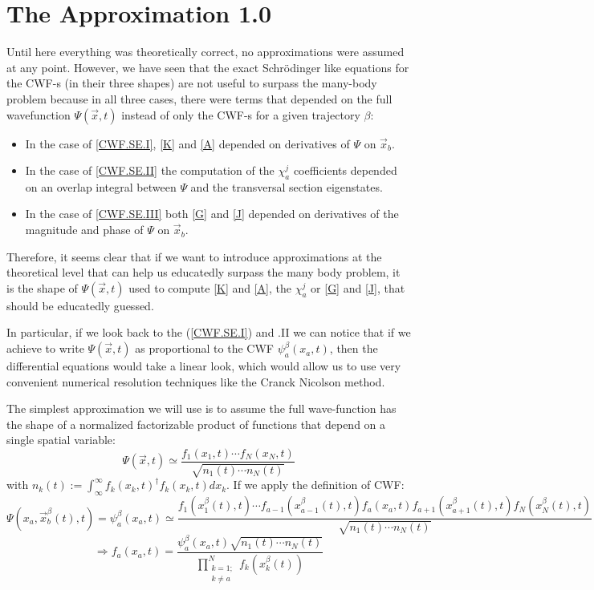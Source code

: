 \documentclass[11pt, a4paper]{article} %
\begin{document}
\newpage
\section{The Approximation 1.0}

Until here everything was theoretically correct, no approximations were assumed at any point. However, we have seen that the exact Schrödinger like equations for the CWF-s (in their three shapes) are not useful to surpass the many-body problem because in all three cases, there were terms that depended on the full wavefunction $\Psi(\vec{x},t)$ instead of only the CWF-s for a given trajectory $\beta$:\vspace{-0.3cm}
\begin{itemize}
\item In the case of \ref{CWF.SE.I}, \ref{K} and \ref{A} depended on derivatives of $\Psi$ on $\vec{x}_b$.

\item In the case of \ref{CWF.SE.II} the computation of the $\chi^j_a$ coefficients depended on an overlap integral between $\Psi$ and the transversal section eigenstates.

\item In the case of \ref{CWF.SE.III} both \ref{G} and \ref{J} depended on derivatives of the magnitude and phase of $\Psi$ on $\vec{x}_b$. 
\end{itemize} 
\vspace{-0.3cm}
Therefore, it seems clear that if we want to introduce approximations at the theoretical level that can help us educatedly surpass the many body problem, it is the shape of $\Psi(\vec{x},t)$ used to compute \ref{K} and \ref{A}, the $\chi_a^j$ or \ref{G} and \ref{J}, that should be educatedly guessed.

In particular, if we look back to the (\ref{CWF.SE.I}) and .II we can notice that if we achieve to write $\Psi(\vec{x},t)$ as proportional to the CWF $\psi_a^\beta(x_a,t)$, then the differential equations would take a linear look, which would allow us to use very convenient numerical resolution techniques like the Cranck Nicolson method.

The simplest approximation we will use is to assume the full wave-function has the shape of a normalized factorizable product of functions that depend on a single spatial variable:
$$
\Psi(\vec{x},t)\simeq \frac{f_1(x_1,t)\cdots f_N(x_N,t)}{\sqrt{n_1(t)\cdots n_N(t)}}
$$
with $n_k(t):=\int_{\infty}^\infty f_k(x_k,t)^\dagger f_k(x_k,t)dx_k$. If we apply the definition of CWF:
$$
\Psi(x_a, \vec{x}_b^\beta(t),t)=\psi_a^\beta(x_a,t)\simeq  \frac{f_1(x_1^\beta(t),t)\cdots f_{a-1}(x_{a-1}^\beta(t),t)f_{a}(x_a,t)f_{a+1}(x_{a+1}^\beta(t),t)f_N(x_N^\beta(t),t)}{\sqrt{n_1(t)\cdots n_N(t)}}
$$
$$
\Longrightarrow f_a(x_a,t)=\frac{\psi_a^\beta(x_a,t) \sqrt{n_1(t)\cdots n_N(t)}}{\prod_{\substack{k=1; \\ k\neq a}}^{N} f_k(x_k^\beta(t))}
$$
\end{document}
